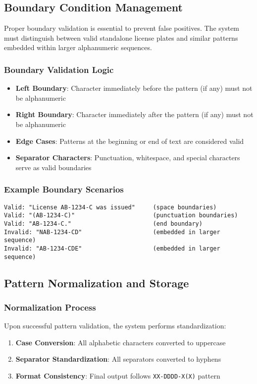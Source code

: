 \documentclass[12pt,a4paper]{article}
\begin{document}
\subsection{Boundary Condition Management}
Proper boundary validation is essential to prevent false positives. The system must distinguish between valid standalone license plates and similar patterns embedded within larger alphanumeric sequences.

\subsubsection{Boundary Validation Logic}
\begin{itemize}
    \item \textbf{Left Boundary}: Character immediately before the pattern (if any) must not be alphanumeric
    \item \textbf{Right Boundary}: Character immediately after the pattern (if any) must not be alphanumeric
    \item \textbf{Edge Cases}: Patterns at the beginning or end of text are considered valid
    \item \textbf{Separator Characters}: Punctuation, whitespace, and special characters serve as valid boundaries
\end{itemize}

\subsubsection{Example Boundary Scenarios}
\begin{lstlisting}[frame=single, backgroundcolor=\color{blue!10}]
Valid: "License AB-1234-C was issued"     (space boundaries)
Valid: "(AB-1234-C)"                      (punctuation boundaries)
Valid: "AB-1234-C."                       (end boundary)
Invalid: "NAB-1234-CD"                    (embedded in larger sequence)
Invalid: "AB-1234-CDE"                    (embedded in larger sequence)
\end{lstlisting}

\subsection{Pattern Normalization and Storage}
\subsubsection{Normalization Process}
Upon successful pattern validation, the system performs standardization:
\begin{enumerate}
    \item \textbf{Case Conversion}: All alphabetic characters converted to uppercase
    \item \textbf{Separator Standardization}: All separators converted to hyphens
    \item \textbf{Format Consistency}: Final output follows \texttt{XX-DDDD-X(X)} pattern
\end{enumerate}
\end{document}
